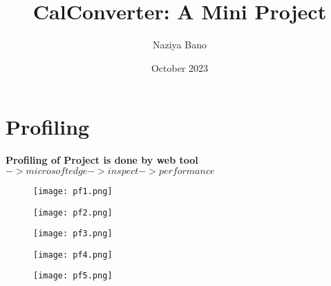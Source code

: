 \documentclass{article}
\title{CalConverter: A Mini Project}
\author{Naziya Bano}
\date{October 2023}
\begin{document}
\section{\huge Profiling}
\Large
\textbf{Profiling of Project is done by web tool $->microsoft edge ->inspect ->performance $}
    \begin{figure}[h]
    \centering
    \texttt{[image: pf1.png]}
\end{figure}
 \begin{figure}[h]
    \centering
    \texttt{[image: pf2.png]}
\end{figure} 

\begin{figure}[h]
    \centering  
    \texttt{[image: pf3.png]}
\end{figure}
\begin{figure}[h]
    \centering
    \texttt{[image: pf4.png]}
\end{figure}
\begin{figure}[h]
    \centering
    \texttt{[image: pf5.png]}
\end{figure}
\end{document}
